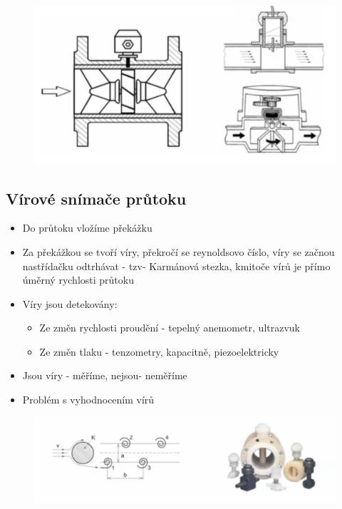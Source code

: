 \begin{figure}[h]
    \centering
    \includegraphics[scale = 0.7]{img/lopatkaaturbin.png}
\end{figure}

\subsection*{Vírové snímače průtoku}
\begin{itemize}
    \item Do průtoku vložíme překážku
    \item Za překážkou se tvoří víry, překročí se reynoldsovo číslo, víry se začnou nastřídačku odtrhávat - tzv- Karmánová stezka, kmitoče vírů je přímo úměrný rychlosti průtoku
    \item Víry jsou detekovány: \begin{itemize}
              \item Ze změn rychlosti proudění - tepelný anemometr, ultrazvuk
              \item Ze změn tlaku - tenzometry, kapacitně, piezoelektricky
          \end{itemize}
    \item Jsou víry - měříme, nejsou- neměříme
    \item Problém s vyhodnocením vírů
\end{itemize}

\begin{figure}[h]
    \centering
    \includegraphics[scale = 1]{img/ViroveSnimaceTrojskyVirPhishingBackdoormrkmrk.png}
\end{figure}

